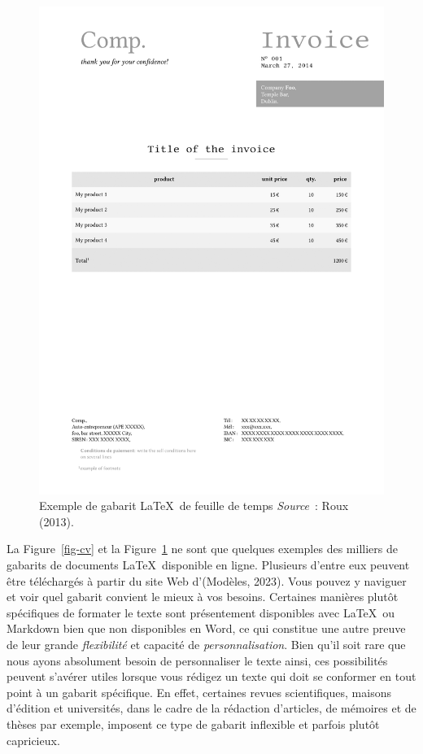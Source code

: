 \documentclass[
  letterpaper,
  DIV=11,
  numbers=noendperiod]{scrreprt}
\begin{document}
\begin{figure}

{\centering \includegraphics[width=5.51in,height=\textheight]{images/chapitre5_TStemp.png}

}

\caption{\label{fig-invoice}Exemple de gabarit \LaTeX~de feuille de
temps \newline \textit{Source}~: Roux (2013).}

\end{figure}

La Figure~\ref{fig-cv} et la Figure~\ref{fig-invoice} ne sont que
quelques exemples des milliers de gabarits de documents
\LaTeX~disponible en ligne. Plusieurs d'entre eux peuvent être
téléchargés à partir du site Web d'(Modèles, 2023). Vous pouvez y
naviguer et voir quel gabarit convient le mieux à vos besoins. Certaines
manières plutôt spécifiques de formater le texte sont présentement
disponibles avec \LaTeX~ou Markdown bien que non disponibles en Word, ce
qui constitue une autre preuve de leur grande \emph{flexibilité} et
capacité de \emph{personnalisation}. Bien qu'il soit rare que nous ayons
absolument besoin de personnaliser le texte ainsi, ces possibilités
peuvent s'avérer utiles lorsque vous rédigez un texte qui doit se
conformer en tout point à un gabarit spécifique. En effet, certaines
revues scientifiques, maisons d'édition et universités, dans le cadre de
la rédaction d'articles, de mémoires et de thèses par exemple, imposent
ce type de gabarit inflexible et parfois plutôt capricieux.
\end{document}

